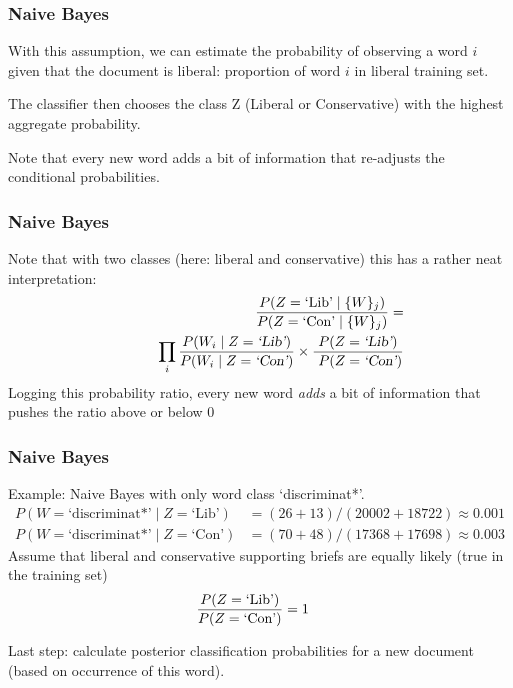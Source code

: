 \documentclass[11pt,compress,professionalfonts]{beamer}
\begin{document}
\begin{frame}[t,fragile]\frametitle{Naive Bayes}

With this assumption, we can estimate the probability of observing a word $i$  given that the document is liberal: proportion of word $i$ in liberal training set.

The classifier then chooses the class Z (Liberal or Conservative) with the highest aggregate probability.

Note that every new word adds a bit of information that re-adjusts the conditional probabilities.

\newpage


\end{frame}
\begin{frame}[t,fragile]\frametitle{Naive Bayes}



Note that with two classes (here: liberal and conservative)  this has a rather neat interpretation:
\begin{align*}
\frac{P(Z=\text{\text{`Lib'}} \mid \{W\}_j)}
{P(Z=\text{`Con'} \mid \{W\}_j)} = \\
~~~~~~~~~\prod_i \frac{P(W_i \mid Z=\textsl{\text{`Lib'}})}
{P(W_i \mid Z=\textsl{`Con'})}\times \frac{P(Z=\textsl{\text{`Lib'}})}{~P(Z=\textsl{`Con'})}
\end{align*}
Logging this probability ratio, every new word \textsl{adds} a bit of information that pushes the ratio above or below 0





\end{frame}
\begin{frame}[t,fragile]\frametitle{Naive Bayes}

Example: Naive Bayes with only word class `discriminat*'.
{\small
\begin{align*}
P(W=\text{`discriminat*'} \mid Z=\text{`Lib'}) & = (26+13)/(20002+18722) \approx 0.001\\
P(W=\text{`discriminat*'} \mid Z=\text{`Con'}) & = (70+48)/(17368+17698) \approx 0.003
\end{align*}
}
Assume that liberal and conservative supporting briefs are equally likely (true in the training set)
\begin{align*}
\frac{P(Z=\text{\text{`Lib'}})}{P(Z=\text{`Con'})} & = 1
\end{align*}

Last step:  calculate posterior classification  probabilities for a new document (based on occurrence of this word).

\end{frame}
\end{document}
